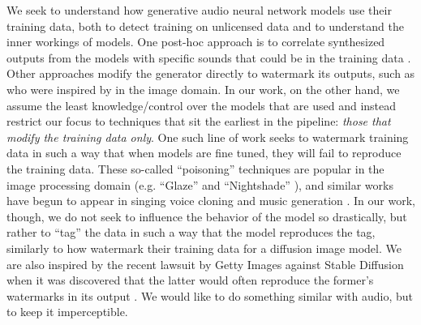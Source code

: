 \documentclass[letterpaper]{article} %
\begin{document}
We seek to understand how generative audio neural network models use their training data, both to detect training on unlicensed data and to understand the inner workings of models.  One post-hoc approach is to correlate synthesized outputs from the models with specific sounds that could be in the training data \cite{batlle2024towards, barnett2024exploring}.  Other approaches modify the generator directly to watermark its outputs, such as \cite{cao2023invisible} who were inspired by \cite{wen2023tree} in the image domain.  In our work, on the other hand, we assume the least knowledge/control over the models that are used and instead restrict our focus to techniques that sit the earliest in the pipeline: {\em those that modify the training data only}. One such line of work seeks to watermark training data in such a way that when models are fine tuned, they will fail to reproduce the training data.  These so-called ``poisoning'' techniques are popular in the image processing domain (e.g. ``Glaze'' \cite{shan2023glaze} and ``Nightshade'' \cite{shan2023prompt}), and similar works have begun to appear in singing voice cloning \cite{chen2024proactive} and music generation \cite{barnett2024defenses}.  In our work, though, we do not seek to influence the behavior of the model so drastically, but rather to ``tag'' the data in such a way that the model reproduces the tag, similarly to how \cite{ditria2023hey} watermark their training data for a diffusion image model.  We are also inspired by the recent lawsuit by Getty Images against Stable Diffusion when it was discovered that the latter would often reproduce the former's watermarks in its output \cite{vincent2023getty}.  We would like to do something similar with audio, but to keep it imperceptible.
\end{document}
